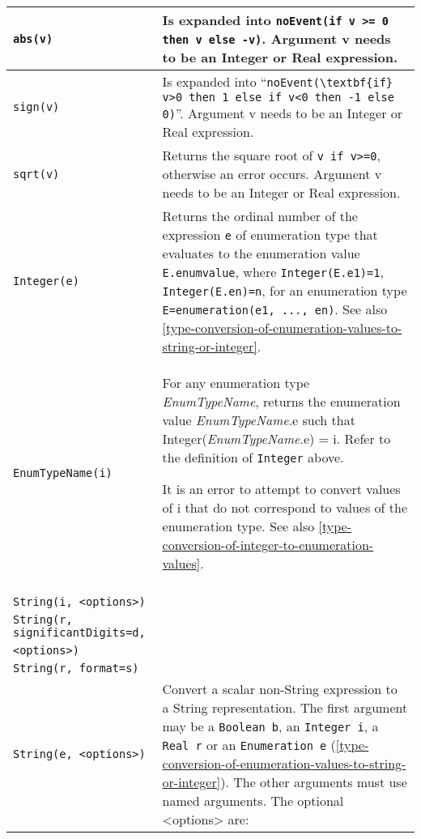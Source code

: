 \begin{longtable}{|p{4.5cm}|p{10cm}|} \hline
\endhead
\lstinline[basicstyle=\ttfamily]!abs(v)! & Is expanded into \lstinline[basicstyle=\ttfamily]!noEvent(if v >= 0 then v else -v)!. Argument v needs to be an Integer or Real expression.\\ \hline
\lstinline[basicstyle=\ttfamily]!sign(v)! & Is expanded into ``\lstinline[basicstyle=\ttfamily]!noEvent(\textbf{if} v>0 then 1 else if v<0 then -1 else 0)!''. Argument v needs to be an Integer or Real
expression.\\ \hline
\lstinline[basicstyle=\ttfamily]!sqrt(v)! & Returns the square root of \lstinline[basicstyle=\ttfamily]!v if v>=0!, otherwise
an error occurs. Argument v needs to be an Integer or Real
expression.\\ \hline

\lstinline[basicstyle=\ttfamily]!Integer(e)! & Returns the ordinal number of the expression \lstinline!e! of
enumeration type that evaluates to the enumeration value \lstinline!E.enumvalue!,
where \lstinline!Integer(E.e1)=1!, \lstinline!Integer(E.en)=n!, for an enumeration type
\lstinline!E=enumeration(e1, ..., en)!. See also \autoref{type-conversion-of-enumeration-values-to-string-or-integer}.\\ \hline
\lstinline[basicstyle=\ttfamily]!EnumTypeName(i)! & 
For any enumeration type \emph{EnumTypeName}, returns the enumeration
value \emph{EnumTypeName}.e such that Integer(\emph{EnumTypeName}.e) =
i. Refer to the definition of \lstinline[basicstyle=\ttfamily]!Integer! above.

It is an error to attempt to convert values of i that do not correspond
to values of the enumeration type. See also \autoref{type-conversion-of-integer-to-enumeration-values}.
\\ \hline

\begin{tabular}{@{}p{4.5cm}@{}}
\lstinline[basicstyle=\ttfamily]!String(b, <options>)!\\
\lstinline[basicstyle=\ttfamily]!String(i, <options>)!\\
\lstinline[basicstyle=\ttfamily]!String(r,!
\hspace{1ex}\lstinline[basicstyle=\ttfamily]!significantDigits=d,!\\
\hspace{1ex}\lstinline[basicstyle=\ttfamily]!<options>)!\\
\lstinline[basicstyle=\ttfamily]!String(r, format=s)!\\
\lstinline[basicstyle=\ttfamily]!String(e, <options>)!
\end{tabular} 
& 
Convert a scalar non-String expression to a String representation. The
first argument may be a \lstinline[basicstyle=\ttfamily]!Boolean b!, an \lstinline[basicstyle=\ttfamily]!Integer i!, a \lstinline[basicstyle=\ttfamily]!Real r! or an
\lstinline[basicstyle=\ttfamily]!Enumeration e! (\autoref{type-conversion-of-enumeration-values-to-string-or-integer}). The other arguments must use named
arguments. The optional \textless{}options\textgreater{} are:


\end{longtable}
